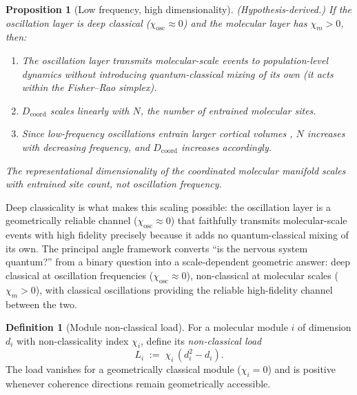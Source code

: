 \documentclass[12pt,a4paper]{article}
\newtheorem{proposition}[theorem]{Proposition}
\theoremstyle{definition}
\newtheorem{definition}[theorem]{Definition}
\theoremstyle{remark}
\begin{document}
\begin{proposition}[Low frequency, high dimensionality]
\label{prop:low-f-high-d}
\emph{(Hypothesis-derived.)} If the oscillation layer is deep classical ($\chi_{\mathrm{osc}} \approx 0$) and the molecular layer has $\chi_m > 0$, then:
\begin{enumerate}
\item[\emph{(i)}] The oscillation layer transmits molecular-scale events to population-level dynamics without introducing quantum-classical mixing of its own (it acts within the Fisher--Rao simplex).
\item[\emph{(ii)}] $D_{\mathrm{coord}}$ scales linearly with $N$, the number of entrained molecular sites.
\item[\emph{(iii)}] Since low-frequency oscillations entrain larger cortical volumes \cite{buzsaki2012mechanisms}, $N$ increases with decreasing frequency, and $D_{\mathrm{coord}}$ increases accordingly.
\end{enumerate}
The representational dimensionality of the coordinated molecular manifold scales with entrained site count, not oscillation frequency.
\end{proposition}

Deep classicality is what makes this scaling possible: the oscillation layer is a geometrically reliable channel ($\chi_{\mathrm{osc}} \approx 0$) that faithfully transmits molecular-scale events with high fidelity precisely because it adds no quantum-classical mixing of its own. The principal angle framework converts ``is the nervous system quantum?'' from a binary question into a scale-dependent geometric answer: deep classical at oscillation frequencies ($\chi_{\mathrm{osc}} \approx 0$), non-classical at molecular scales ($\chi_m > 0$), with classical oscillations providing the reliable high-fidelity channel between the two.

\begin{definition}[Module non-classical load]
\label{def:module-load}
For a molecular module $i$ of dimension $d_i$ with non-classicality index $\chi_i$, define its \emph{non-classical load}
\begin{equation}
\label{eq:module-load}
L_i \;:=\; \chi_i\,(d_i^2-d_i).
\end{equation}
The load vanishes for a geometrically classical module ($\chi_i = 0$) and is positive whenever coherence directions remain geometrically accessible.
\end{definition}
\end{document}
